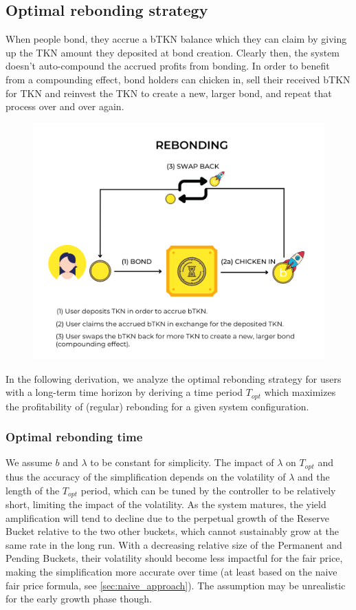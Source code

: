\documentclass{article}
\begin{document}
\subsection{Optimal rebonding strategy}
  \label{sec:rebonding_strategy}
When people bond, they accrue a bTKN balance which they can claim by giving up the TKN amount they deposited at bond creation. Clearly then, the system doesn't auto-compound the accrued profits from bonding. In order to benefit from a compounding effect, bond holders can chicken in, sell their received bTKN for TKN and reinvest the TKN to create a new, larger bond, and repeat that process over and over again.

\begin{figure}[ht]
    \centering
    \includegraphics[width=0.5\linewidth]{./rebonding_text.png}
\end{figure}

In the following derivation, we analyze the optimal rebonding strategy for users with a long-term time horizon by deriving a time period $T_{opt}$ which maximizes the profitability of (regular) rebonding for a given system configuration.

\subsubsection{Optimal rebonding time}
  \label{sec:T_OP}
We assume $b$ and $\lambda$ to be constant for simplicity. The impact of $\lambda$ on $T_{opt}$ and thus the accuracy of the simplification depends on the volatility of $\lambda$ and the length of the $T_{opt}$ period, which can be tuned by the controller to be relatively short, limiting the impact of the volatility. As the system matures, the yield amplification will tend to decline due to the perpetual growth of the Reserve Bucket relative to the two other buckets, which cannot sustainably grow at the same rate in the long run. With a decreasing relative size of the Permanent and Pending Buckets, their volatility should become less impactful for the fair price, making the simplification more accurate over time (at least based on the naive fair price formula, see \ref{sec:naive_approach}). The assumption may be unrealistic for the early growth phase though.
\end{document}
